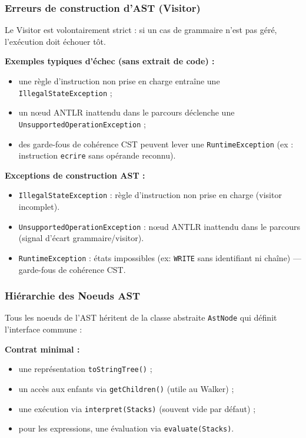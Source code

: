 \subsubsection{Erreurs de construction d'AST (Visitor)}

Le Visitor est volontairement strict : si un cas de grammaire n'est pas géré, l'exécution doit échouer tôt.

\noindent\textbf{Exemples typiques d'échec (sans extrait de code) :}
\begin{itemize}
    \item une règle d'instruction non prise en charge entraîne une \texttt{IllegalStateException} ;
    \item un nœud ANTLR inattendu dans le parcours déclenche une \texttt{UnsupportedOperationException} ;
    \item des garde-fous de cohérence CST peuvent lever une \texttt{RuntimeException} (ex : instruction \texttt{ecrire} sans opérande reconnu).
\end{itemize}

\noindent\textbf{Exceptions de construction AST :}
\begin{itemize}
    \item \texttt{IllegalStateException} : règle d'instruction non prise en charge (visitor incomplet).
    \item \texttt{UnsupportedOperationException} : nœud ANTLR inattendu dans le parcours (signal d'écart grammaire/visitor).
    \item \texttt{RuntimeException} : états impossibles (ex: \texttt{WRITE} sans identifiant ni chaîne) — garde-fous de cohérence CST.
\end{itemize}

\subsubsection{Hiérarchie des Noeuds AST}

Tous les noeuds de l'AST héritent de la classe abstraite \texttt{AstNode} qui définit l'interface commune :

\noindent\textbf{Contrat minimal :}
\begin{itemize}
    \item une représentation \texttt{toStringTree()} ;
    \item un accès aux enfants via \texttt{getChildren()} (utile au Walker) ;
    \item une exécution via \texttt{interpret(Stacks)} (souvent vide par défaut) ;
    \item pour les expressions, une évaluation via \texttt{evaluate(Stacks)}.
\end{itemize}

